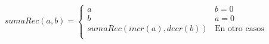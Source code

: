 \documentclass[12pt,letterpaper]{article}
\begin{document}





\[
  sumaRec(a,b) = 
  \begin{cases}
    a & b = 0\\
    b & a = 0\\
    sumaRec(incr(a),decr(b)) & \text{En otro casos} \\
  \end{cases}
\]





\end{document}
